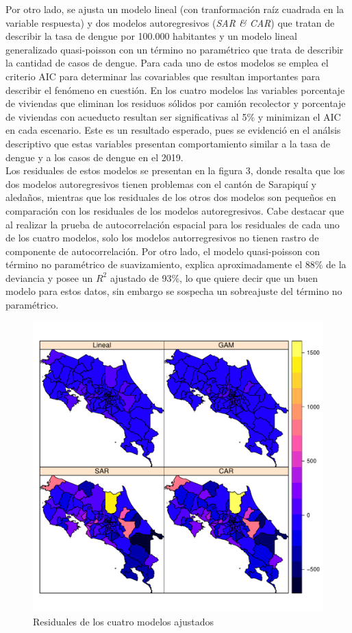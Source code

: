 \documentclass[a4paper,12pt]{report}
\begin{document}
Por otro lado, se ajusta un modelo lineal (con tranformación raíz cuadrada en la variable respuesta) y dos modelos autoregresivos (\textit{SAR \& CAR}) que tratan de describir la tasa de dengue por 100.000 habitantes y un modelo lineal generalizado quasi-poisson con un término no paramétrico que trata de describir la cantidad de casos de dengue. Para cada uno de estos modelos se emplea el criterio AIC para determinar las covariables que resultan importantes para describir el fenómeno en cuestión. En los cuatro modelos las variables porcentaje de viviendas que eliminan los residuos sólidos por camión recolector y porcentaje de viviendas con acueducto resultan ser significativas al 5\% y minimizan el AIC en cada escenario. Este es un resultado esperado, pues se evidenció en el análsis descriptivo que estas variables presentan comportamiento similar a la tasa de dengue y a los casos de dengue en el 2019.\\
Los residuales de estos modelos se presentan en la figura 3, donde resalta que los dos modelos autoregresivos tienen problemas con el cantón de Sarapiquí y aledaños, mientras que los residuales de los  otros dos modelos son pequeños en comparación con los residuales de los modelos autoregresivos. Cabe destacar que al realizar la prueba de autocorrelación espacial para los residuales de cada uno de los cuatro modelos, solo los modelos autorregresivos no tienen rastro de componente de autocorrelación. Por otro lado, el modelo quasi-poisson con término no paramétrico de suavizamiento, explica aproximadamente el 88\% de la deviancia y posee un $R^{2}$ ajustado de 93\%, lo que quiere decir que un buen modelo para estos datos, sin embargo se sospecha un sobreajuste del término no paramétrico.

\begin{figure}[hbtp]
\centering
\includegraphics[scale=0.45]{F4.pdf}
\caption{Residuales de los cuatro modelos ajustados}
\end{figure}
\end{document}

